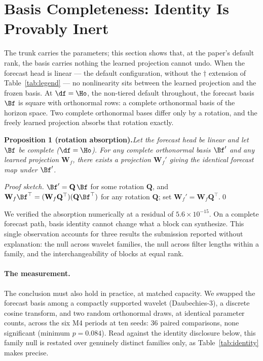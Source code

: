 \section{Basis Completeness: Identity Is Provably Inert}\label{sec:completeness}

The trunk carries the parameters; this section shows that, at the paper's default rank, the basis
carries nothing the learned projection cannot undo. When the forecast head is linear --- the
default configuration, without the $\dagger$ extension of Table~\ref{tab:legend} --- no
nonlinearity sits between the learned projection and the frozen basis. At $\df = \Ho$, the
non-tiered default throughout, the forecast basis $\Bf$ is square with orthonormal rows: a
complete orthonormal basis of the horizon space. Two complete orthonormal bases differ only by a
rotation, and the freely learned projection absorbs that rotation exactly.

\smallskip
\noindent\textbf{Proposition 1 (rotation absorption).}\quad\emph{Let the forecast head be linear
and let $\Bf$ be complete ($\df = \Ho$). For any complete orthonormal basis $\Bf'$ and any
learned projection $\mathbf{W}_{f}$, there exists a projection $\mathbf{W}_{f}'$ giving the
identical forecast map under $\Bf'$.}

\smallskip
\noindent\emph{Proof sketch.} $\Bf' = \mathbf{Q}\,\Bf$ for some rotation $\mathbf{Q}$, and
$\mathbf{W}_{f}\Bf^{\top} = (\mathbf{W}_{f}\mathbf{Q}^{\top})(\mathbf{Q}\Bf^{\top})$ for any
rotation $\mathbf{Q}$; set $\mathbf{W}_{f}' = \mathbf{W}_{f}\mathbf{Q}^{\top}$.\qed

\smallskip
We verified the absorption numerically at a residual of $5.6 \times 10^{-15}$. On a complete
forecast path, basis identity cannot change what a block can synthesize. This single observation
accounts for three results the submission reported without explanation: the null across wavelet
families, the null across filter lengths within a family, and the interchangeability of blocks at
equal rank.

\paragraph{The measurement.} The conclusion must also hold in practice, at matched capacity. We
swapped the forecast basis among a compactly supported wavelet (Daubechies-3), a discrete cosine
transform, and two random orthonormal draws, at identical parameter counts, across the six M4
periods at ten seeds: 36 paired comparisons, none significant (minimum $p = 0.084$). Read against
the identity disclosure below, this family null is restated over genuinely distinct families
only, as Table~\ref{tab:identity} makes precise.

